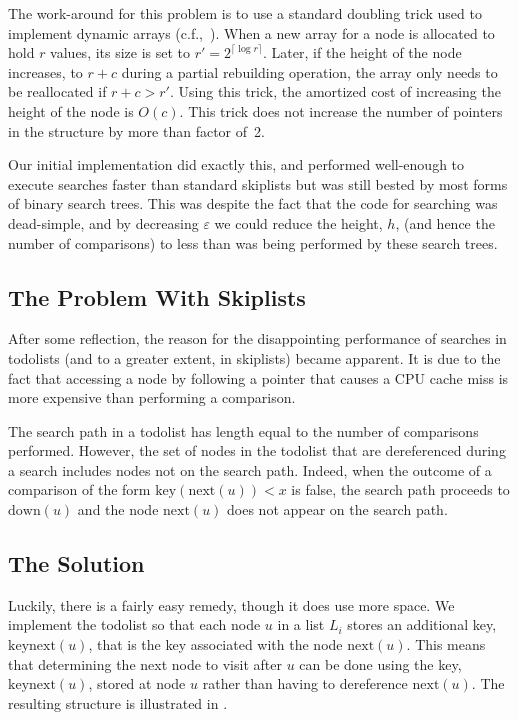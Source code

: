 \documentclass{patmorin}
\newcommand{\eps}{\varepsilon}
\begin{document}
The work-around for this problem is to use a standard
doubling trick used to implement dynamic arrays (c.f.,~\cite[Section~2.1.2]{morin:open}). When a new array for a node
is allocated to hold $r$ values, its size is set to $r'=2^{\lceil\log
r\rceil}$.  Later, if the height of the node increases, to $r+c$ during
a partial rebuilding operation, the array only needs to be reallocated
if $r+c > r'$.  Using this trick, the amortized
cost of increasing the height of the node is $O(c)$.  This trick does not
increase the number of pointers in the structure by more than factor of~2.

Our initial implementation did exactly this, and performed well-enough
to execute searches faster than standard skiplists but was still bested
by most forms of binary search trees.  This was despite the fact that
the code for searching was dead-simple, and by decreasing $\eps$ we
could reduce the height, $h$, (and hence the number of comparisons)
to less than was being performed by these search trees.

\subsection{The Problem With Skiplists}

After some reflection, the reason for the disappointing performance of
searches in todolists (and to a greater extent, in skiplists) became
apparent. It is due to the fact that accessing a node by following a
pointer that causes a CPU cache miss is more expensive than performing
a comparison.

The search path in a todolist has length equal to the number of
comparisons performed.  However, the set of nodes in the todolist
that are dereferenced during a search includes nodes not on the
search path. Indeed, when the outcome of a comparison of the form
$\mathrm{key}(\mathrm{next}(u)) < x$ is false, the search path proceeds
to $\mathrm{down}(u)$ and the node $\mathrm{next}(u)$ does not appear on
the search path.

\subsection{The Solution}

Luckily, there is a fairly easy remedy, though it does use more space.
We implement the todolist so that each node $u$ in a list $L_i$ stores an
additional key, $\mathrm{keynext}(u)$, that is the key associated with
the node $\mathrm{next}(u)$.  This means that determining the next node
to visit after $u$ can be done using the key, $\mathrm{keynext}(u)$, stored
at node $u$ rather than having to dereference $\mathrm{next}(u)$. The
resulting structure is illustrated in .
\end{document}
